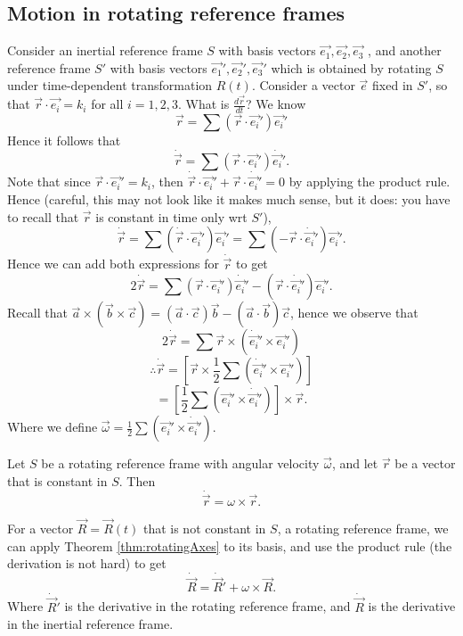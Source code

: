 \subsection{Motion in rotating reference frames}
Consider an inertial reference frame $S$ with basis vectors
$\vec{e_1},\vec{e_2},\vec{e_3}$ , and another reference frame $S'$ with basis
vectors $\vec{e_1}',\vec{e_2}',\vec{e_3}'$ which is obtained by rotating $S$
under time-dependent transformation $R(t)$. Consider a vector $\vec{e}$ fixed in
$S'$, so that $\vec{r}\cdot\vec{e_i}=k_i$ for all $i=1,2,3$. What is
$\frac{d\vec{r}}{dt}$? We know
\[\vec{r}= \sum (\vec{r}\cdot\vec{e_i}') \vec{e_i}'\]
Hence it follows that 
\[\dot{\vec{r}}= \sum (\vec{r}\cdot\vec{e_i}') \dot{\vec{e_i}}'.\]
Note that since $\vec{r}\cdot\vec{e_i}'=k_i$, then $\dot{\vec{r}}\cdot\vec{e_i}' +
\vec{r}\cdot \dot{\vec{e_i}}'=0$ by applying the product rule. Hence (careful,
  this may not look like it makes much sense, but it does: you have to recall
that $\vec{r}$ is constant in time only wrt $S'$),
\[\dot{\vec{r}}=\sum (\dot{\vec{r}}\cdot \vec{e_i}')\vec{e_i}' = \sum
(-\vec{r}\cdot\dot{\vec{e_i}}')\vec{e_i}'. \]
Hence we can add both expressions for $\dot{\vec{r}}$ to get 
\[2\dot{\vec{r}} = \sum (\vec{r}\cdot\vec{e_i}') \dot{\vec{e_i}}' -
(\vec{r}\cdot\dot{\vec{e_i}}')\vec{e_i}'.\]
Recall that $\vec{a}\times(\vec{b}\times\vec{c})= (\vec{a}\cdot\vec{c})\vec{b} -
(\vec{a}\cdot\vec{b})\vec{c}$, hence we observe that 
\[2\dot{\vec{r}}= \sum \vec{r}\times(\dot{\vec{e_i}}'\times\vec{e_i}')\]
\[\therefore \dot{\vec{r}}=\left[\vec{r}\times  \frac{1}{2}\sum
(\dot{\vec{e_i}}'\times\vec{e_i}')\right]\]
\[= \left[  \frac{1}{2}\sum
(\vec{e_i}'\times\dot{\vec{e_i}}' )\right] \times \vec{r}.\]
Where we define $\vec{\omega}=\frac{1}{2}\sum (\vec{e_i}'\times\dot{\vec{e_i}}'
)$.
\begin{theorem}
  Let $S$ be a rotating reference frame with angular velocity $\vec{\omega}$,
  and let $\vec{r}$ be a vector that is constant in $S$. Then 
  \[\dot{\vec{r}} = \omega\times\vec{r}.\]
  \label{thm:rotatingAxes}
\end{theorem}

For a vector $\vec{R}=\vec{R}(t)$ that is not constant in $S$, a rotating
reference frame, we can apply Theorem \ref{thm:rotatingAxes} to its basis, and
use the product rule (the derivation is not hard) to get
\[\dot{\vec{R}} = \dot{\vec{R}}' + \omega\times\vec{R}.\]
Where $\dot{\vec{R}}'$ is the derivative in the rotating reference frame, and
$\dot{\vec{R}}$ is the derivative in the inertial reference frame.
